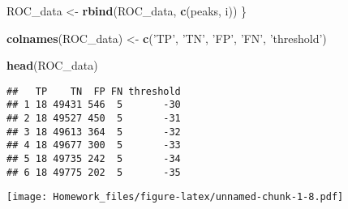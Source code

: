 \documentclass[]{article}
\newenvironment{Shaded}{\begin{snugshade}}{\end{snugshade}}
\newcommand{\KeywordTok}[1]{\textcolor[rgb]{0.13,0.29,0.53}{\textbf{#1}}}
\newcommand{\DataTypeTok}[1]{\textcolor[rgb]{0.13,0.29,0.53}{#1}}
\newcommand{\FloatTok}[1]{\textcolor[rgb]{0.00,0.00,0.81}{#1}}
\newcommand{\StringTok}[1]{\textcolor[rgb]{0.31,0.60,0.02}{#1}}
\newcommand{\OperatorTok}[1]{\textcolor[rgb]{0.81,0.36,0.00}{\textbf{#1}}}
\newcommand{\NormalTok}[1]{#1}
\begin{document}
\begin{Shaded}
\begin{Highlighting}[]
\NormalTok{  ROC_data <-}\StringTok{ }\KeywordTok{rbind}\NormalTok{(ROC_data, }\KeywordTok{c}\NormalTok{(peaks, i))}
\NormalTok{\}}

\KeywordTok{colnames}\NormalTok{(ROC_data) <-}\StringTok{ }\KeywordTok{c}\NormalTok{(}\StringTok{'TP'}\NormalTok{, }\StringTok{'TN'}\NormalTok{, }\StringTok{'FP'}\NormalTok{, }\StringTok{'FN'}\NormalTok{, }\StringTok{'threshold'}\NormalTok{)}

\KeywordTok{head}\NormalTok{(ROC_data)}
\end{Highlighting}
\end{Shaded}

\begin{verbatim}
##   TP    TN  FP FN threshold
## 1 18 49431 546  5       -30
## 2 18 49527 450  5       -31
## 3 18 49613 364  5       -32
## 4 18 49677 300  5       -33
## 5 18 49735 242  5       -34
## 6 18 49775 202  5       -35
\end{verbatim}

\begin{Shaded}
\end{Shaded}

\texttt{[image: Homework\_files/figure-latex/unnamed-chunk-1-8.pdf]}
\end{document}
